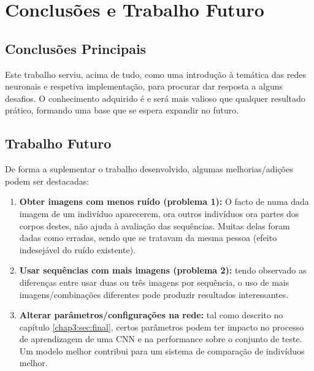 \chapter{Conclusões e Trabalho Futuro}
\label{chap:conc-trab-futuro}

\section{Conclusões Principais}
\label{sec:conc-princ}

Este trabalho serviu, acima de tudo, como uma introdução à temática das redes neuronais e respetiva implementação, para procurar dar resposta a alguns desafios. O conhecimento adquirido é e será mais valioso que qualquer resultado prático, formando uma base que se espera expandir no futuro.

\section{Trabalho Futuro}
\label{sec:trab-futuro}

De forma a suplementar o trabalho desenvolvido, algumas melhorias/adições podem ser destacadas:

\begin{enumerate}
    \item \textbf{Obter imagens com menos ruído (problema 1):} O facto de numa dada imagem de um indivíduo aparecerem, ora outros indivíduos ora partes dos corpos destes, não ajuda à avaliação das sequências. Muitas delas foram dadas como erradas, sendo que se tratavam da mesma pessoa (efeito indesejável do ruído existente).
    \item \textbf{Usar sequências com mais imagens (problema 2):} tendo observado as diferenças entre usar duas ou três imagens por sequência, o uso de mais imagens/combinações diferentes pode produzir resultados interessantes.
    \item \textbf{Alterar parâmetros/configurações na rede:} tal como descrito no capítulo \ref{chap3:sec:final}, certos parâmetros podem ter impacto no processo de aprendizagem de uma CNN e na performance sobre o conjunto de teste. Um modelo melhor contribui para um sistema de comparação de indivíduos melhor.
\end{enumerate}{}